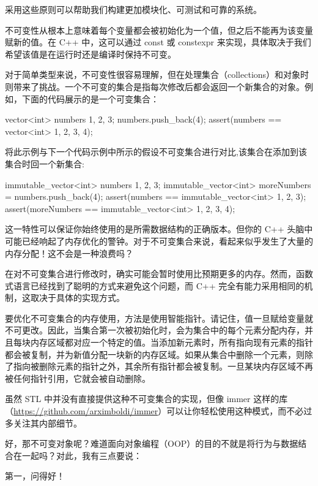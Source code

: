 采用这些原则可以帮助我们构建更加模块化、可测试和可靠的系统。


不可变性从根本上意味着每个变量都会被初始化为一个值，但之后不能再为该变量赋新的值。在 C++ 中，这可以通过 const 或 constexpr 来实现，具体取决于我们希望该值是在运行时还是编译时保持不可变。

对于简单类型来说，不可变性很容易理解，但在处理集合（collections）和对象时则带来了挑战。一个不可变的集合是指每次修改后都会返回一个新集合的对象。例如，下面的代码展示的是一个可变集合：

\begin{cpp}
vector<int> numbers {1, 2, 3};
numbers.push_back(4);
assert(numbers == vector<int> {1, 2, 3, 4});
\end{cpp}

将此示例与下一个代码示例中所示的假设不可变集合进行对比,该集合在添加到该集合时回一个新集合:

\begin{cpp}
immutable_vector<int> numbers {1, 2, 3};
immutable_vector<int> moreNumbers = numbers.push_back(4);
assert(numbers == immutable_vector<int> {1, 2, 3});
assert(moreNumbers == immutable_vector<int> {1, 2, 3, 4});
\end{cpp}

这一特性可以保证你始终使用的是所需数据结构的正确版本。但你的 C++ 头脑中可能已经响起了内存优化的警钟。对于不可变集合来说，看起来似乎发生了大量的内存分配！这不会是一种浪费吗？

在对不可变集合进行修改时，确实可能会暂时使用比预期更多的内存。然而，函数式语言已经找到了聪明的方式来避免这个问题，而 C++ 完全有能力采用相同的机制，这取决于具体的实现方式。

要优化不可变集合的内存使用，方法是使用智能指针。请记住，值一旦赋给变量就不可更改。因此，当集合第一次被初始化时，会为集合中的每个元素分配内存，并且每块内存区域都对应一个特定的值。当添加新元素时，所有指向现有元素的指针都会被复制，并为新值分配一块新的内存区域。如果从集合中删除一个元素，则除了指向被删除元素的指针之外，其余所有指针都会被复制。一旦某块内存区域不再被任何指针引用，它就会被自动删除。

虽然 STL 中并没有直接提供这种不可变集合的实现，但像 immer 这样的库（\url{https://github.com/arximboldi/immer}）可以让你轻松使用这种模式，而不必过多关注其内部细节。

好，那不可变对象呢？难道面向对象编程（OOP）的目的不就是将行为与数据结合在一起吗？对此，我有三点要说：

第一，问得好！

